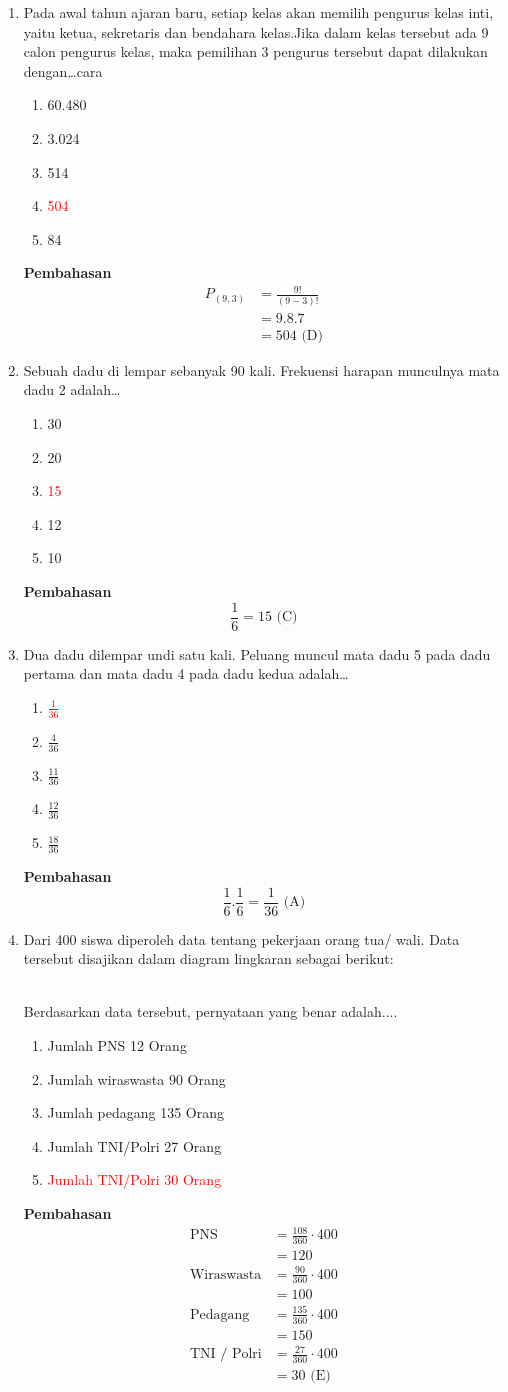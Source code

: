 \documentclass{report}
\newcommand{\options}[5]{
\begin{enumerate}[label=\alph*.]
	\item #1
	\item #2
	\item #3
	\item #4
	\item #5
\end{enumerate}
}
\newcommand{\pemb}{ \textbf{Pembahasan} \\}
\begin{document}
\begin{enumerate}
\item Pada awal tahun ajaran baru, setiap kelas akan memilih pengurus kelas inti, yaitu ketua, sekretaris dan bendahara kelas.Jika dalam kelas tersebut ada 9 calon pengurus kelas, maka pemilihan 3 pengurus tersebut dapat dilakukan dengan\ldots cara
\options
{60.480}
{3.024}
{514}
{\textcolor{red}{504}}
{84}
\pemb
\begin{align*}
	P_{(9,3)} 
	&= \frac{9!}{(9-3)!} \\
	&= 9.8.7 \\
	&= 504 \text{ (D)}
\end{align*}

\item Sebuah dadu di lempar sebanyak 90 kali. Frekuensi harapan munculnya mata dadu 2 adalah\ldots
\options
{30}
{20}
{\textcolor{red}{15}}
{12}
{10}
\pemb
\[
	\frac{1}{6}=15\text{ (C)}
\]

\item Dua dadu dilempar undi satu kali. Peluang muncul mata dadu 5 pada dadu pertama dan mata dadu 4 pada dadu kedua adalah\ldots
\options
{\textcolor{red}{$\frac{1}{36}$}}
{$\frac{4}{36}$}
{$\frac{11}{36}$}
{$\frac{12}{36}$}
{$\frac{18}{36}$}
\pemb
\[
	\frac{1}{6}.\frac{1}{6} = \frac{1}{36} \text{ (A)}
\]
\item Dari 400 siswa diperoleh data tentang pekerjaan orang tua/ wali. Data tersebut disajikan dalam diagram lingkaran sebagai berikut:\\
	 \\
Berdasarkan data tersebut, pernyataan yang benar adalah....
\options
{Jumlah PNS 12 Orang}
{Jumlah wiraswasta 90 Orang}
{Jumlah pedagang 135 Orang}
{Jumlah TNI/Polri 27 Orang}
{\textcolor{red}{Jumlah TNI/Polri 30 Orang}}
\pemb
\begin{align*}
	\text{PNS} &= \frac{108}{360} \cdot 400 \\
	    &= 120 \\
	\text{Wiraswasta}&= \frac{90}{360} \cdot 400 \\
	    &= 100 \\
	\text{Pedagang} &= \frac{135}{360} \cdot 400 \\
	    &= 150 \\
	\text{TNI / Polri} &= \frac{27}{360} \cdot 400 \\
	    &= 30 \text{ (E)}
\end{align*}


\end{enumerate}
\end{document}

